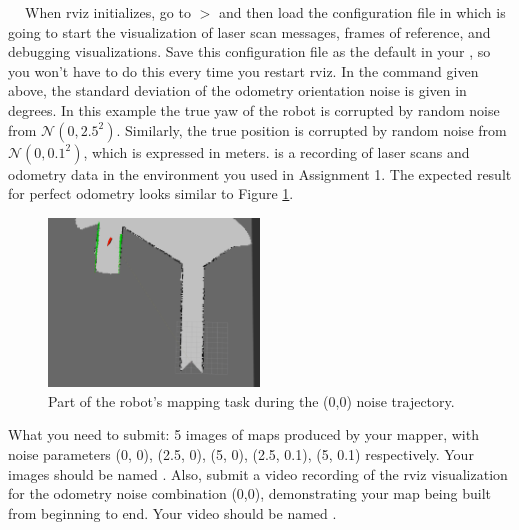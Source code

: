 \documentclass[a4paper,10pt]{article}
\begin{document}
   $\;$  $\;$  
\newline
\newline
\noindent When rviz initializes, go to  $>$  and then load the configuration file in 
which is going to start the visualization of laser scan messages, frames of reference, and debugging visualizations. Save this configuration file as the default
in your , so you won't have to do this every time you restart rviz. In the  command given above, the standard deviation of 
the odometry orientation noise is given in degrees. In this example the true yaw of the robot is corrupted by random noise from $\mathcal{N}(0, 2.5^2)$. Similarly, the true position 
is corrupted by random noise from $\mathcal{N}(0, 0.1^2)$, which is expressed in meters.  is a recording of laser scans and odometry data in the environment 
you used in Assignment 1. The expected result for perfect odometry looks similar to Figure \ref{fig:gmapping}. 
\newline
\begin{figure}[h]
  \begin{center}
    \includegraphics[width=0.5\textwidth]{gmapping}
  \end{center} 
  \caption{Part of the robot's mapping task during the (0,0) noise trajectory.}
  \label{fig:gmapping}
\end{figure}
\newline
\newline
\noindent What you need to submit: 5 images of maps produced by your mapper, with noise parameters (0, 0), (2.5, 0), (5, 0), (2.5, 0.1), (5, 0.1) respectively. 
Your images should be named . Also, submit a video recording of the rviz visualization for the odometry noise combination (0,0),
demonstrating your map being built from beginning to end. Your video should be named . 
\end{document}
